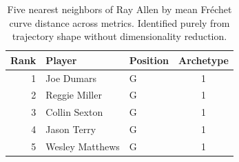 \begin{table}[htbp]
  \centering\small
  \begin{tabular}{rllc}
    \toprule
    Rank & Player & Position & Archetype \\
    \midrule
    1 & Joe Dumars & G & 1 \\
    2 & Reggie Miller & G & 1 \\
    3 & Collin Sexton & G & 1 \\
    4 & Jason Terry & G & 1 \\
    5 & Wesley Matthews & G & 1 \\
    \bottomrule
  \end{tabular}
  \caption{Five nearest neighbors of Ray Allen by mean Fr\'{e}chet curve distance across metrics. Identified purely from trajectory shape without dimensionality reduction.}
  \label{tab:Ray_Allen_frechet_curve_neighbors}
\end{table}


